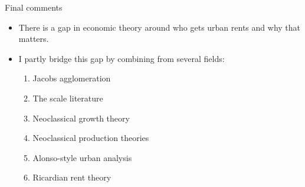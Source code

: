 \documentclass[hide notes=show/only]{beamer} %
\begin{document}
\begin{frame}{Final comments}
 \begin{itemize} \Large
\item There is a gap in economic theory around who gets urban rents and why that matters.
\item I partly bridge this gap by combining from several  fields:

    \begin{enumerate}\item Jacobs agglomeration
    
    \item The scale literature 
    
    \item Neoclassical growth theory
    
    \item Neoclassical production theories
    
    \item Alonso-style urban analysis
    
    \item Ricardian rent theory
    \end{enumerate}
\end{itemize}
\end{frame}
\end{document}
